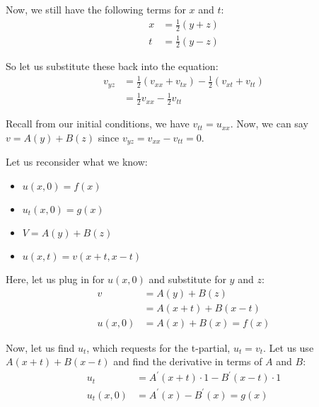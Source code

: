 Now, we still have the following terms for $x$ and $t$:
%
\begin{align}
  x & = \frac{1}{2}(y + z)\\
  t & = \frac{1}{2}(y - z)
\end{align}

So let us substitute these back into the equation:
%
\begin{align}
  v_{yz} &
  = \frac{1}{2} \left(v_{xx} + v_{tx}\right)
  - \frac{1}{2} \left(v_{xt} + v_{tt}\right)\\
  & = \frac{1}{2} v_{xx} - \frac{1}{2} v_{tt}
\end{align}

Recall from our initial conditions, we have $v_{tt} = u_{xx}$.
Now, we can say $v = A(y) + B(z)$ since $v_{yz} = v_{xx} - v_{tt} = 0$.

Let us reconsider what we know:
\begin{itemize}
  \item $u(x, 0) = f(x)$
  \item $u_t(x, 0) = g(x)$
  \item $V = A(y) + B(z)$
  \item $u(x, t) = v(x + t, x - t)$
\end{itemize}

Here, let us plug in for $u(x, 0)$ and substitute for $y$ and $z$:
%
\begin{align}
  v & = A(y) + B(z)\\
  & = A(x + t) + B(x - t)\\
  u(x, 0) & = A(x) + B(x) = f(x)
\end{align}

Now, let us find $u_t$, which requests for the t-partial, $u_t = v_t$. Let us use $A(x + t) + B(x - t)$ and find the derivative in terms of $A$ and $B$:
%
\begin{align}
  u_t & = A^\prime(x + t) \cdot 1 - B^\prime(x - t) \cdot 1\\
  u_t(x, 0) & = A^\prime(x) - B^\prime(x) = g(x)
\end{align}

